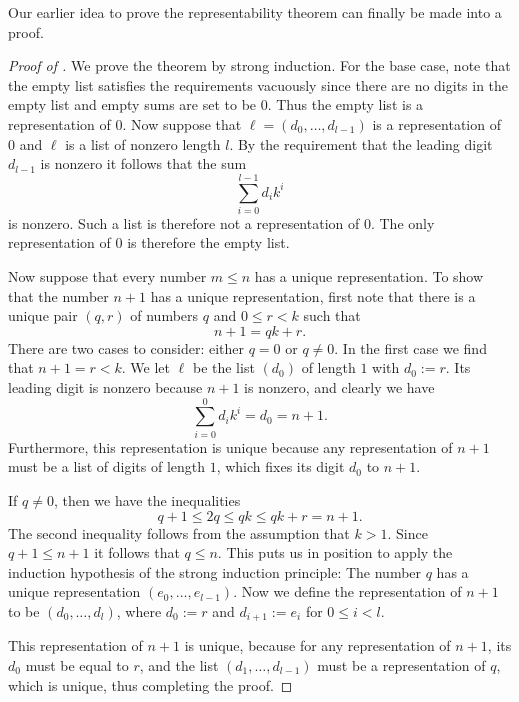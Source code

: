Our earlier idea to prove the representability theorem can finally be made into a proof.

\begin{proof}[Proof of ]
  We prove the theorem by strong induction. For the base case, note that the empty list satisfies the requirements vacuously since there are no digits in the empty list and empty sums are set to be $0$. Thus the empty list is a representation of $0$. Now suppose that $\ell=(d_0,\ldots,d_{l-1})$ is a representation of $0$ and $\ell$ is a list of nonzero length $l$. By the requirement that the leading digit $d_{l-1}$ is nonzero it follows that the sum
  \begin{equation*}
    \sum_{i=0}^{l-1}d_ik^i
  \end{equation*}
  is nonzero. Such a list is therefore not a representation of $0$. The only representation of $0$ is therefore the empty list.

  Now suppose that every number $m\leq n$ has a unique representation. To show that the number $n+1$ has a unique representation, first note that there is a unique pair $(q,r)$ of numbers $q$ and $0\leq r<k$ such that
  \begin{equation*}
    n+1=qk+r.
  \end{equation*}
  There are two cases to consider: either $q=0$ or $q\neq 0$. In the first case we find that $n+1=r<k$. We let $\ell$ be the list $(d_0)$ of length $1$ with $d_0:= r$. Its leading digit is nonzero because $n+1$ is nonzero, and clearly we have
  \begin{equation*}
    \sum_{i=0}^0 d_ik^i = d_0 = n+1.
  \end{equation*}
  Furthermore, this representation is unique because any representation of $n+1$ must be a list of digits of length $1$, which fixes its digit $d_0$ to $n+1$.

  If $q\neq 0$, then we have the inequalities
  \begin{equation*}
    q+1 \leq 2q \leq qk \leq qk+r=n+1.
  \end{equation*}
  The second inequality follows from the assumption that $k>1$. Since $q+1\leq n+1$ it follows that $q\leq n$. This puts us in position to apply the induction hypothesis of the strong induction principle: The number $q$ has a unique representation $(e_0,\ldots,e_{l-1})$. Now we define the representation of $n+1$ to be $(d_0,\ldots,d_l)$, where $d_0:=r$ and $d_{i+1}:=e_i$ for $0\leq i<l$.

  This representation of $n+1$ is unique, because for any representation of $n+1$, its $d_0$ must be equal to $r$, and the list $(d_1,\ldots,d_{l-1})$ must be a representation of $q$, which is unique, thus completing the proof.
\end{proof}

